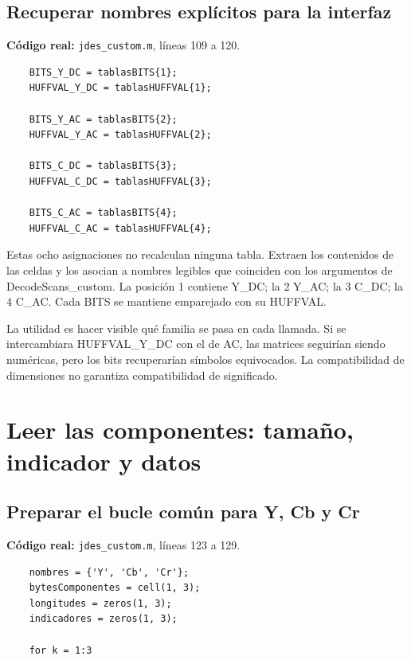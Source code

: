 \documentclass[11pt,a4paper,oneside]{report}
\begin{document}
\par\medskip\noindent\begin{minipage}{\linewidth}

\subsection{Recuperar nombres explícitos para la interfaz}

\textbf{Código real:} \texttt{jdes\_custom.m}, líneas 109 a 120.

\begin{lstlisting}[firstnumber=109]
    % Identificar las especificaciones de cada tabla.
    BITS_Y_DC = tablasBITS{1};
    HUFFVAL_Y_DC = tablasHUFFVAL{1};

    BITS_Y_AC = tablasBITS{2};
    HUFFVAL_Y_AC = tablasHUFFVAL{2};

    BITS_C_DC = tablasBITS{3};
    HUFFVAL_C_DC = tablasHUFFVAL{3};

    BITS_C_AC = tablasBITS{4};
    HUFFVAL_C_AC = tablasHUFFVAL{4};
\end{lstlisting}

\end{minipage}\par


Estas ocho asignaciones no recalculan ninguna tabla. Extraen los contenidos
de las celdas y los asocian a nombres legibles que coinciden con los argumentos
de DecodeScans\_custom. La posición 1 contiene Y\_DC; la 2 Y\_AC; la 3 C\_DC;
la 4 C\_AC. Cada BITS se mantiene emparejado con su HUFFVAL.

La utilidad es hacer visible qué familia se pasa en cada llamada. Si se
intercambiara HUFFVAL\_Y\_DC con el de AC, las matrices seguirían siendo
numéricas, pero los bits recuperarían símbolos equivocados. La compatibilidad
de dimensiones no garantiza compatibilidad de significado.


\section{Leer las componentes: tamaño, indicador y datos}

\par\medskip\noindent\begin{minipage}{\linewidth}

\subsection{Preparar el bucle común para Y, Cb y Cr}

\textbf{Código real:} \texttt{jdes\_custom.m}, líneas 123 a 129.

\begin{lstlisting}[firstnumber=123]
    % PASO 5: leer las tres componentes comprimidas.
    nombres = {'Y', 'Cb', 'Cr'};
    bytesComponentes = cell(1, 3);
    longitudes = zeros(1, 3);
    indicadores = zeros(1, 3);

    for k = 1:3
\end{lstlisting}

\end{minipage}\par
\end{document}
